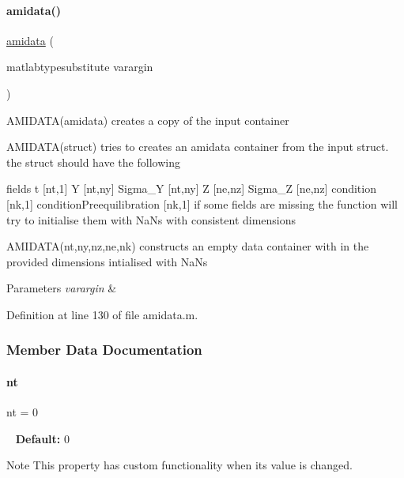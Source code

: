 \paragraph{\texorpdfstring{amidata()}{amidata()}}
{\footnotesize\ttfamily \mbox{\hyperlink{classamidata}{amidata}} (\begin{DoxyParamCaption}\item[{matlabtypesubstitute}]{varargin }\end{DoxyParamCaption})}

A\+M\+I\+D\+A\+T\+A(amidata) creates a copy of the input container

A\+M\+I\+D\+A\+T\+A(struct) tries to creates an amidata container from the input struct. the struct should have the following \begin{DoxyParagraph}{fields}
t \mbox{[}nt,1\mbox{]} Y \mbox{[}nt,ny\mbox{]} Sigma\+\_\+Y \mbox{[}nt,ny\mbox{]} Z \mbox{[}ne,nz\mbox{]} Sigma\+\_\+Z \mbox{[}ne,nz\mbox{]} condition \mbox{[}nk,1\mbox{]} condition\+Preequilibration \mbox{[}nk,1\mbox{]} if some fields are missing the function will try to initialise them with Na\+Ns with consistent dimensions
\end{DoxyParagraph}
A\+M\+I\+D\+A\+T\+A(nt,ny,nz,ne,nk) constructs an empty data container with in the provided dimensions intialised with Na\+Ns


\begin{DoxyParams}{Parameters}
{\em varargin} & \\
\hline
\end{DoxyParams}


Definition at line 130 of file amidata.\+m.



\subsubsection{Member Data Documentation}
\mbox{\label{classamidata_a03cfcdd983bff4aef77268b785b28345}} 
\paragraph{\texorpdfstring{nt}{nt}}
{\footnotesize\ttfamily nt = 0}

~\newline
{\bfseries{Default\+:}} 0

\begin{DoxyNote}{Note}
This property has custom functionality when its value is changed. 
\end{DoxyNote}


